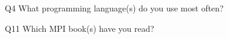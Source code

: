 \begin{description}%
\item{Q4} What programming language(s) do you use most often?%
\item{Q11} Which MPI book(s) have you read?%
\end{description}%
